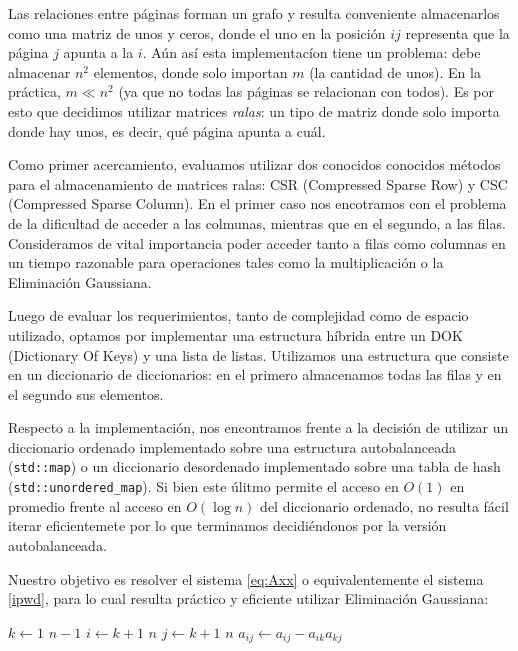 
\par Las relaciones entre p\'aginas forman un grafo y resulta conveniente almacenarlos como una
matriz de unos y ceros, donde el uno en la posici\'on $ij$ representa que la p\'agina $j$ apunta a la $i$.
A\'un as\'i esta implementac\'ion tiene un problema: debe almacenar $n^2$ elementos, donde solo importan
$m$ (la cantidad de unos). En la pr\'actica, $m \ll n^2$ (ya que no todas las p\'aginas se relacionan
con todos). Es por esto que decidimos utilizar matrices \textit{ralas}: un tipo de matriz donde solo
importa donde hay unos, es decir, qu\'e p\'agina apunta a cu\'al.
\par Como primer acercamiento, evaluamos utilizar dos conocidos conocidos m\'etodos para el almacenamiento
de matrices ralas: CSR (Compressed Sparse Row) y CSC (Compressed Sparse Column). En el primer caso
nos encotramos con el problema de la dificultad de acceder a las colmunas, mientras que en el segundo,
a las filas. Consideramos de vital importancia poder acceder tanto a filas como columnas en un tiempo
razonable para operaciones tales como la multiplicación o la Eliminación Gaussiana.
\par Luego de evaluar los requerimientos, tanto de complejidad como de espacio utilizado, optamos
por implementar una estructura h\'ibrida entre un DOK (Dictionary Of Keys) y una lista de listas. 
Utilizamos una estructura que consiste en un diccionario de diccionarios: en el primero almacenamos
todas las filas y en el segundo sus elementos.
\par Respecto a la implementaci\'on, nos encontramos frente a la decisión de utilizar un diccionario ordenado
implementado sobre una estructura autobalanceada (\verb|std::map|) o un diccionario desordenado
implementado sobre una tabla de hash (\verb|std::unordered_map|). Si bien este \'ulitmo permite
el acceso en $O(1)$ en promedio frente al acceso en $O(\log n)$ del diccionario ordenado, 
no resulta f\'acil iterar eficientemete por lo que terminamos decidi\'endonos por la versi\'on autobalanceada.
\par Nuestro objetivo es resolver el sistema \ref{eq:Axx} o equivalentemente el sistema \ref{ipwd}, para lo cual 
resulta pr\'actico y eficiente utilizar Eliminación Gaussiana:

\begin{codebox}
\li \For $k \gets 1$ \To $n-1$
    \Do
\li     \For $i \gets k+1$ \To $n$
            \Do
\li         \For $j \gets k+1$ \To $n$
                \Do
\li                 $a_{ij} \gets a_{ij} - a_{ik}a_{kj}$
                \End
            \End
        \End
\end{codebox}

